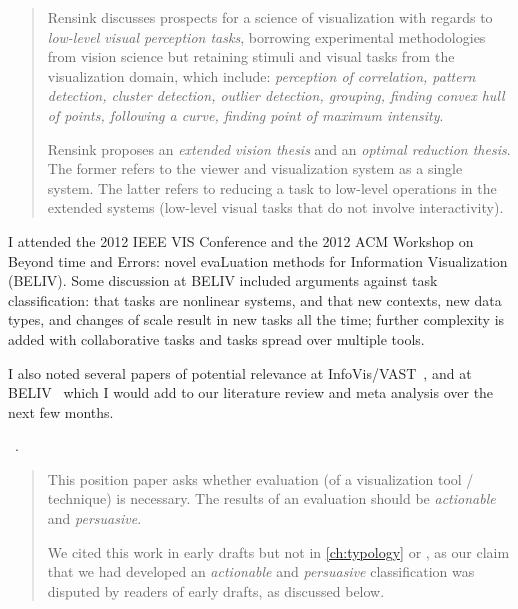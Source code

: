 \begin{quotation}
    Rensink discusses prospects for a science of visualization with regards to {\it low-level visual perception tasks}, borrowing experimental methodologies from vision science but retaining stimuli and visual tasks from the visualization domain, which include: {\it perception of correlation, pattern detection, cluster detection, outlier detection, grouping, finding convex hull of points, following a curve, finding point of maximum intensity}. 

    Rensink proposes an {\it extended vision thesis} and an {\it optimal reduction thesis}. 
    The former refers to the viewer and visualization system as a single system. 
    The latter refers to reducing a task to low-level operations in the extended systems (low-level visual tasks that do not involve interactivity).

\end{quotation}

I attended the 2012 IEEE VIS Conference and the 2012 ACM Workshop on Beyond time and Errors: novel evaLuation methods for Information Visualization (BELIV).
Some discussion at BELIV included arguments against task classification: that tasks are nonlinear systems, and that new contexts, new data types, and changes of scale result in new tasks all the time; further complexity is added with collaborative tasks and tasks spread over multiple tools.

I also noted several papers of potential relevance at InfoVis/VAST~\cite{Cottam2012,Crouser2012,Lee2012,Pohl2012}, and at BELIV~\cite{Gleicher2012,Mcnamara2012} which I would add to our literature review and meta analysis over the next few months.

\begin{sloppypar}
~\cite{Gleicher2012}. \end{sloppypar}

\begin{quotation}
    This position paper asks whether evaluation (of a visualization tool / technique) is necessary.
    The results of an evaluation should be {\it actionable} and {\it persuasive}.

    We cited this work in early drafts but not in \autoref{ch:typology} or \citet{Brehmer2013}, as our claim that we had developed an {\it actionable} and {\it persuasive} classification was disputed by readers of early drafts, as discussed below.
\end{quotation}

